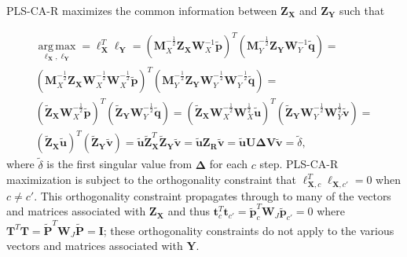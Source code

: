 \documentclass[12pt]{article}
\begin{document}
PLS-CA-R maximizes the common information between
\({\mathbf Z}_{\mathbf X}\) and \({\mathbf Z}_{\mathbf Y}\) such that

\begin{equation}
\begin{aligned}
\underset{{\boldsymbol \ell}_{\mathbf X},{\boldsymbol \ell}_{\mathbf Y}}{\operatorname{arg\,max}} = {\boldsymbol \ell}_{\mathbf X}^{T}{\boldsymbol \ell}_{\mathbf Y} = 
({\mathbf M}_{X}^{-\frac{1}{2}}{\mathbf Z}_{\mathbf X}{\mathbf W}_{X}^{-1}\widetilde{\mathbf p})^{T}({\mathbf M}_{Y}^{-\frac{1}{2}}{\mathbf Z}_{\mathbf Y}{\mathbf W}_{Y}^{-1}\widetilde{\mathbf q}) = \\
({\mathbf M}_{X}^{-\frac{1}{2}}{\mathbf Z}_{\mathbf X}{\mathbf W}_{X}^{-\frac{1}{2}}{\mathbf W}_{X}^{-\frac{1}{2}}\widetilde{\mathbf p})^{T}({\mathbf M}_{Y}^{-\frac{1}{2}}{\mathbf Z}_{\mathbf Y}{\mathbf W}_{Y}^{-\frac{1}{2}}{\mathbf W}_{Y}^{-\frac{1}{2}}\widetilde{\mathbf q}) = \\
( \widetilde{\mathbf Z}_{\mathbf X} {\mathbf W}_{X}^{-\frac{1}{2}}\widetilde{\mathbf p})^{T}(\widetilde{\mathbf Z}_{\mathbf Y}{\mathbf W}_{Y}^{-\frac{1}{2}}\widetilde{\mathbf q}) = 
( \widetilde{\mathbf Z}_{\mathbf X} {\mathbf W}_{X}^{-\frac{1}{2}}{\mathbf W}_{X}^{\frac{1}{2}}\widetilde{\mathbf u})^{T}(\widetilde{\mathbf Z}_{\mathbf Y}{\mathbf W}_{Y}^{-\frac{1}{2}}{\mathbf W}_{Y}^{\frac{1}{2}}\widetilde{\mathbf v}) = \\ 
(\widetilde{\mathbf Z}_{\mathbf X}\widetilde{\mathbf u})^{T}(\widetilde{\mathbf Z}_{\mathbf Y}\widetilde{\mathbf v}) = \widetilde{\mathbf u}\widetilde{\mathbf Z}_{\mathbf X}^{T}\widetilde{\mathbf Z}_{\mathbf Y}\widetilde{\mathbf v} = \widetilde{\mathbf u}{\mathbf Z}_{\mathbf R}\widetilde{\mathbf v} = \widetilde{\mathbf u}{\mathbf U}{\boldsymbol \Delta}{\mathbf V}\widetilde{\mathbf v}  = \widetilde\delta,
\end{aligned}
\end{equation} where \(\widetilde\delta\) is the first singular value
from \({\mathbf \Delta}\) for each \(c\) step. PLS-CA-R maximization is
subject to the orthogonality constraint that
\({\boldsymbol \ell}_{{\mathbf X},c}^{T}{\boldsymbol \ell}_{{\mathbf X},c'} = 0\)
when \(c \neq c'\). This orthogonality constraint propagates through to
many of the vectors and matrices associated with
\({\mathbf Z}_{\mathbf X}\) and thus
\({\mathbf t}_{c}^{T}{\mathbf t}_{c'} = \widetilde{\mathbf p}_{c}^{T}{\mathbf W}_{J}\widetilde{\mathbf p}_{c'} = 0\)
where
\({\mathbf T}^{T}{\mathbf T} = \widetilde{\mathbf P}^{T}{\mathbf W}_{J}\widetilde{\mathbf P} = {\mathbf I}\);
these orthogonality constraints do not apply to the various vectors and
matrices associated with \({\mathbf Y}\).
\end{document}
